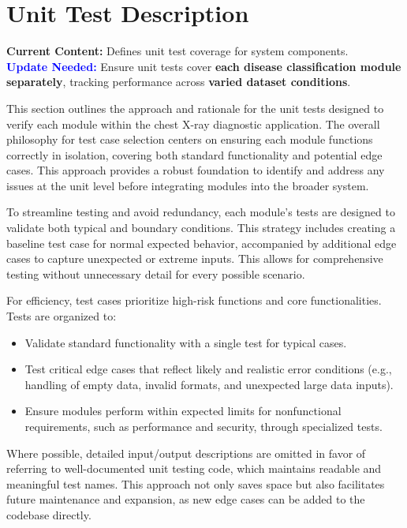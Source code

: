 \documentclass[12pt, titlepage]{article}
\begin{document}
\section{Unit Test Description}
\textbf{Current Content:} Defines unit test coverage for system components. \\
\textbf{\textcolor{blue}{Update Needed:}} Ensure unit tests cover \textbf{each disease classification module separately}, tracking performance across \textbf{varied dataset conditions}.

This section outlines the approach and rationale for the unit tests designed to verify each module within the chest X-ray diagnostic application. The overall philosophy for test case selection centers on ensuring each module functions correctly in isolation, covering both standard functionality and potential edge cases. This approach provides a robust foundation to identify and address any issues at the unit level before integrating modules into the broader system.

To streamline testing and avoid redundancy, each module’s tests are designed to validate both typical and boundary conditions. This strategy includes creating a baseline test case for normal expected behavior, accompanied by additional edge cases to capture unexpected or extreme inputs. This allows for comprehensive testing without unnecessary detail for every possible scenario.

For efficiency, test cases prioritize high-risk functions and core functionalities. Tests are organized to:
\begin{itemize}
  \item Validate standard functionality with a single test for typical cases.
  \item Test critical edge cases that reflect likely and realistic error conditions (e.g., handling of empty data, invalid formats, and unexpected large data inputs).
  \item Ensure modules perform within expected limits for nonfunctional requirements, such as performance and security, through specialized tests.
\end{itemize}

Where possible, detailed input/output descriptions are omitted in favor of referring to well-documented unit testing code, which maintains readable and meaningful test names. This approach not only saves space but also facilitates future maintenance and expansion, as new edge cases can be added to the codebase directly.
\end{document}
